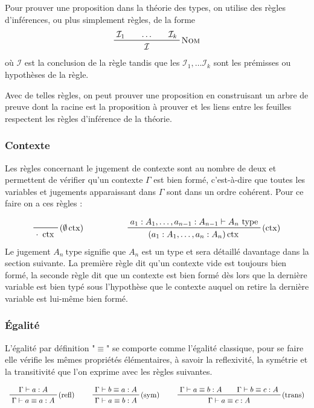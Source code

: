 \documentclass[../../rapport.tex]{subfiles}
\begin{document}
  Pour prouver une proposition dans la théorie des types, on utilise des règles d'inférences, ou plus simplement règles, de la forme
  $$
  \prfinterspace=2em
  \prftree[r]{\textsc{Nom}}{\mathcal I_1}{\hdots}{\mathcal I_k}{\mathcal I}
  $$
  où $\mathcal I$ est la conclusion de la règle tandis que les $\mathcal I_1, \hdots \mathcal I_k$
  sont les prémisses ou hypothèses de la règle.

  Avec de telles règles, on peut prouver une proposition en construisant un arbre de preuve
  dont la racine est la proposition à prouver et les liens entre les feuilles respectent les règles d'inférence de la théorie.

  \subsubsection{Contexte}

  Les règles concernant le jugement de contexte sont au nombre de deux et permettent de vérifier qu'un contexte $\Gamma$ est bien formé,
  c'est-à-dire que toutes les variables et jugements apparaissant dans $\Gamma$ sont dans un ordre cohérent.
  Pour ce faire on a ces règles :

  $$
  \begin{array}{cc}
    \prfbyaxiom{($\emptyset\ctx$)}{\cdot\ \ctx} \hspace{1.5cm}
    & \prftree[r]{($\ctx$)}{a_1 : A_1, \hdots, a_{n-1} : A_{n-1} \vdash A_n\ \text{type}}
      {(a_1 : A_1, \hdots, a_n : A_n) \ctx}
  \end{array}
  $$
  Le jugement $A_n\ \text{type}$ signifie que $A_n$ est un type et sera détaillé davantage dans la section suivante.
  La première règle dit qu'un contexte vide est toujours bien formé, la seconde règle dit que un contexte est bien formé
  dès lors que la dernière variable est bien typé sous l'hypothèse que le contexte auquel on retire la dernière variable
  est lui-même bien formé.

  \subsubsection{Égalité}

  L'égalité par définition "$\equiv$" se comporte comme l'égalité classique, pour se faire elle vérifie les mêmes propriétés élémentaires,
  à savoir la reflexivité, la symétrie et la transitivité que l'on exprime avec les règles suivantes.

  $$
  \prfinterspace=2em
  \begin{array}{ccc}
    \prftree[r]{(refl)}{\Gamma \vdash a : A}{\Gamma \vdash a \equiv a : A} \hspace{0.5cm}
    & \prftree[r]{(sym)} {\Gamma \vdash b \equiv a : A}{\Gamma \vdash a \equiv b : A} \hspace{0.5cm}
    & \prftree[r]{(trans)}{\Gamma \vdash a \equiv b : A}{\Gamma \vdash b \equiv c : A}{\Gamma \vdash a \equiv c : A}
  \end{array}
  $$
\end{document}
